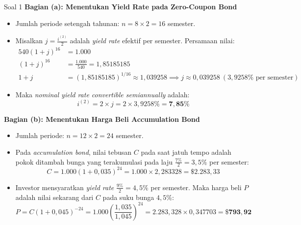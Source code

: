 \documentclass[11pt,a4paper]{article}
\begin{document}
\begin{solutionbox}{Soal 1}
\textbf{Bagian (a): Menentukan Yield Rate pada Zero-Coupon Bond}
\begin{itemize}
    \item Jumlah periode setengah tahunan: $n = 8 \times 2 = 16$ semester.
    \item Misalkan $j = \frac{i^{(2)}}{2}$ adalah \textit{yield rate} efektif per semester. Persamaan nilai:
    \begin{align*}
        540(1 + j)^{16} &= 1.000 \\[0.3em]
        (1 + j)^{16} &= \frac{1.000}{540} = 1{,}85185185 \\[0.3em]
        1 + j &= (1{,}85185185)^{1/16} \approx 1{,}039258 \implies j \approx 0{,}039258 \ (3{,}9258\% \text{ per semester})
    \end{align*}
    \item Maka \textit{nominal yield rate convertible semiannually} adalah:
    \begin{equation*}
        i^{(2)} = 2 \times j = 2 \times 3{,}9258\% = \mathbf{7{,}85\%}
    \end{equation*}
\end{itemize}

\textbf{Bagian (b): Menentukan Harga Beli Accumulation Bond}
\begin{itemize}
    \item Jumlah periode: $n = 12 \times 2 = 24$ semester.
    \item Pada \textit{accumulation bond}, nilai tebusan $C$ pada saat jatuh tempo adalah pokok ditambah bunga yang terakumulasi pada laju $\frac{7\%}{2} = 3{,}5\%$ per semester:
    \begin{equation*}
        C = 1.000(1 + 0{,}035)^{24} = 1.000 \times 2{,}283328 = \$2.283{,}33
    \end{equation*}
    \item Investor mensyaratkan \textit{yield rate} $\frac{9\%}{2} = 4{,}5\%$ per semester. Maka harga beli $P$ adalah nilai sekarang dari $C$ pada suku bunga $4{,}5\%$:
    \begin{equation*}
        P = C(1 + 0{,}045)^{-24} = 1.000 \left(\frac{1{,}035}{1{,}045}\right)^{24} = 2.283{,}328 \times 0{,}347703 = \mathbf{\$793{,}92}
    \end{equation*}
\end{itemize}
\end{solutionbox}

\vspace{1.2em}
\end{document}
